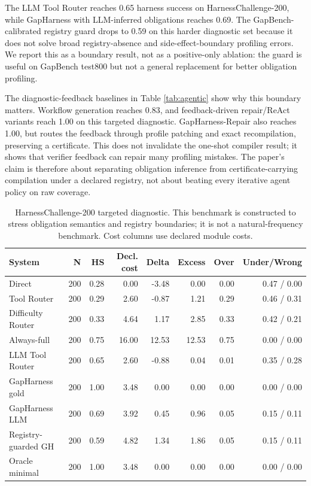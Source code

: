 \documentclass[
  10pt,
]{article}
\begin{document}
The LLM Tool Router reaches 0.65 harness success on
HarnessChallenge-200, while GapHarness with LLM-inferred obligations
reaches 0.69. The GapBench-calibrated registry guard drops to 0.59 on
this harder diagnostic set because it does not solve broad
registry-absence and side-effect-boundary profiling errors. We report
this as a boundary result, not as a positive-only ablation: the guard is
useful on GapBench test800 but not a general replacement for better
obligation profiling.

The diagnostic-feedback baselines in Table \ref{tab:agentic} show why
this boundary matters. Workflow generation reaches 0.83, and
feedback-driven repair/ReAct variants reach 1.00 on this targeted
diagnostic. GapHarness-Repair also reaches 1.00, but routes the feedback
through profile patching and exact recompilation, preserving a
certificate. This does not invalidate the one-shot compiler result; it
shows that verifier feedback can repair many profiling mistakes. The
paper's claim is therefore about separating obligation inference from
certificate-carrying compilation under a declared registry, not about
beating every iterative agent policy on raw coverage.

\begin{table}[H]
\centering
\scriptsize
\caption{HarnessChallenge-200 targeted diagnostic. This benchmark is constructed to stress obligation semantics and registry boundaries; it is not a natural-frequency benchmark. Cost columns use declared module costs.}
\label{tab:harnesschallenge}
\begin{tabular}{lrrrrrrr}
\toprule
System & N & HS & Decl. cost & Delta & Excess & Over & Under/Wrong\\
\midrule
Direct & 200 & 0.28 & 0.00 & -3.48 & 0.00 & 0.00 & 0.47 / 0.00\\
Tool Router & 200 & 0.29 & 2.60 & -0.87 & 1.21 & 0.29 & 0.46 / 0.31\\
Difficulty Router & 200 & 0.33 & 4.64 & 1.17 & 2.85 & 0.33 & 0.42 / 0.21\\
Always-full & 200 & 0.75 & 16.00 & 12.53 & 12.53 & 0.75 & 0.00 / 0.00\\
LLM Tool Router & 200 & 0.65 & 2.60 & -0.88 & 0.04 & 0.01 & 0.35 / 0.28\\
GapHarness gold & 200 & 1.00 & 3.48 & 0.00 & 0.00 & 0.00 & 0.00 / 0.00\\
GapHarness LLM & 200 & 0.69 & 3.92 & 0.45 & 0.96 & 0.05 & 0.15 / 0.11\\
Registry-guarded GH & 200 & 0.59 & 4.82 & 1.34 & 1.86 & 0.05 & 0.15 / 0.11\\
Oracle minimal & 200 & 1.00 & 3.48 & 0.00 & 0.00 & 0.00 & 0.00 / 0.00\\
\bottomrule
\end{tabular}
\end{table}
\end{document}
